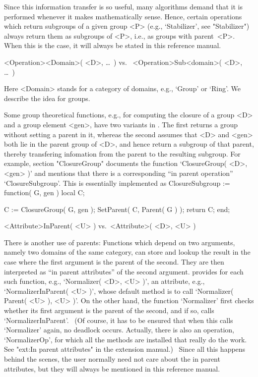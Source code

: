 Since this information transfer is so useful, many algorithms demand that
it is  performed whenever it  makes  mathematically sense. Hence, certain
operations     which  return subgroups  of   a    given  group <P> (e.g.,
`Stabilizer',  see "Stabilizer") always  return them as subgroups of <P>,
i.e., as groups with parent~<P>. When this is the case, it will always be
stated in this reference manual.

\)\fmark <Operation><Domain>( <D>, \dots\ ) {\rm vs.}\ %
  <Operation>Sub<domain>( <D>, \dots\ )

%
Here <Domain> stands for a category  of domains, e.g., `Group' or `Ring'.
We describe the idea for groups.

Some  group theoretical functions, e.g.,  for  computing the closure of a
group <D>  and a group  element <gen>, have  two variants in  {\GAP}. The
first returns a group without setting a parent in  it, whereas the second
assumes that <D> and <gen> both lie in the parent group of <D>, and hence
return a subgroup of that parent, thereby transfering infomation from the
parent to   the resulting subgroup.  For example,  section "ClosureGroup"
documents the function `ClosureGroup(   <D>, <gen> )' and  mentions  that
there is a  corresponding ``in parent operation'' `ClosureSubgroup'. This
is essentially implemented as
\begintt
    ClosureSubgroup := function( G, gen )
    local   C;

        C := ClosureGroup( G, gen );
        SetParent( C, Parent( G ) );
        return C;
    end;
\endtt

\)\fmark <Attribute>InParent( <U> ) {\rm vs.}\ <Attribute>( <D>, <U> )

%
There is another use of parents: Functions which depend on two arguments,
namely two domains of the same category, can  store and lookup the result
in the case  where the first argument is  the parent of  the second. They
are then interpreted as ``in parent attributes''  of the second argument.
{\GAP} provides for each  such function, e.g.,  `Normalizer( <D>, <U> )',
an attribute, e.g., `NormalizerInParent( <U> )',  whose default method is
to call `Normalizer( Parent(   <U> ), <U>   )'. On  the other  hand,  the
function  `Normalizer'  first checks whether   its  first argument is the
parent of the  second,   and if  so,  calls `NormalizerInParent'.  \  (Of
course, it has to be ensured that when this  calls `Normalizer' again, no
deadlock  occurs. Actually, there  is  also an operation, `NormalizerOp',
for which all the  methods  are installed that   really do the work.  See
"ext:In  parent attributes" in  the  extension manual.)  \ Since all this
happens behind the scenes, the  user normally need  not care about the in
parent  attributes, but they will  always be mentioned  in this reference
manual.

